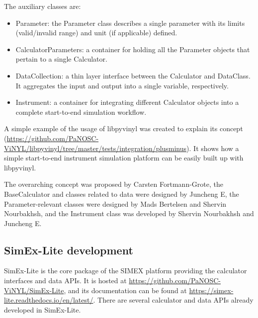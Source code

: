 \documentclass[11pt, a4paper]{article}
\begin{document}
The auxiliary classes are:
\begin{itemize}
    \item Parameter: the Parameter class describes a single parameter with its limits (valid/invalid range) and unit (if applicable) defined.
    \item CalculatorParameters: a container for holding all the Parameter objects that pertain to a single Calculator.
    \item DataCollection: a thin layer interface between the Calculator and DataClass. It aggregates the input and output into a single variable, respectively.
    \item Instrument: a container for integrating different Calculator objects into a complete start-to-end simulation workflow.
\end{itemize}

A simple example of the usage of libpyvinyl was created to explain its concept (\url{https://github.com/PaNOSC-ViNYL/libpyvinyl/tree/master/tests/integration/plusminus}). It shows how a simple start-to-end instrument simulation platform can be easily built up with libpyvinyl.

The overarching concept was proposed by Carsten Fortmann-Grote, the BaseCalculator and classes related to data were designed by Juncheng E, the Parameter-relevant classes were designed by Mads Bertelsen and Shervin Nourbakhsh, and the Instrument class was developed by Shervin Nourbakhsh and Juncheng E.

\subsection{SimEx-Lite development}

SimEx-Lite is the core package of the SIMEX platform providing the calculator interfaces and data APIs. It is hosted at \url{https://github.com/PaNOSC-ViNYL/SimEx-Lite}, and its documentation can be found at \url{https://simex-lite.readthedocs.io/en/latest/}. There are several calculator and data APIs already developed in SimEx-Lite. 
\end{document}
